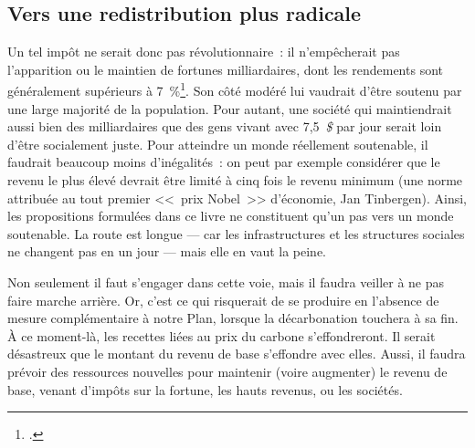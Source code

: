 \documentclass[a5paper,french,openany]{memoir}
\begin{document}
\subsection{Vers une redistribution plus radicale}
Un tel impôt ne serait donc pas révolutionnaire~: il n'empêcherait pas l'apparition ou le maintien de fortunes milliardaires, dont les rendements sont généralement supérieurs à 7~\%\footnote{\cite{chancel_world_2022}.}. 
Son côté modéré lui vaudrait d'être soutenu par une large majorité de la population. Pour autant, une société qui maintiendrait aussi bien des milliardaires que des gens vivant avec 7,5~\textit{\$} par jour serait loin d'être socialement juste. Pour atteindre un monde réellement soutenable, il faudrait beaucoup moins d'inégalités~: %
on peut par exemple considérer que le revenu le plus élevé devrait être limité à cinq fois le revenu minimum (une norme attribuée au tout premier <<~prix Nobel~>> d'économie, Jan Tinbergen). Ainsi, les propositions formulées dans ce livre ne constituent qu'un pas vers un monde soutenable. La route est longue --- car les infrastructures et les structures sociales ne changent pas en un jour --- mais elle en vaut la peine.  

Non seulement il faut s'engager dans cette voie, mais il faudra veiller à ne pas faire marche arrière. Or, c'est ce qui risquerait de se produire en l'absence de mesure complémentaire à notre Plan, lorsque la décarbonation touchera à sa fin. %
À ce moment-là, les recettes liées au prix du carbone s'effondreront. Il serait désastreux que le montant du revenu de base s'effondre avec elles. Aussi, il faudra prévoir des ressources nouvelles pour maintenir (voire augmenter) le revenu de base, 
venant d'impôts sur la fortune, les hauts revenus, ou les sociétés. 
\end{document}
